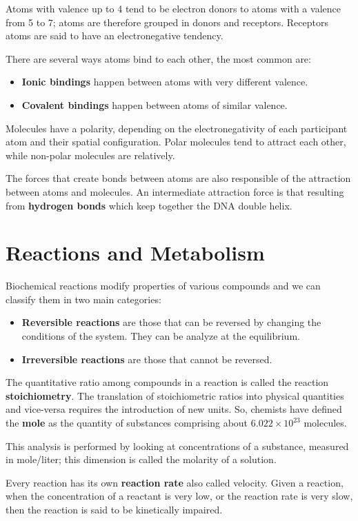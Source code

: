 Atoms with valence up to 4 tend to be electron donors to atoms with a valence
from 5 to 7; atoms are therefore grouped in donors and receptors. Receptors atoms
are said to have an electronegative tendency.

There are several ways atoms bind to each other, the most common are:
\begin{itemize}
    \item \textbf{Ionic bindings} happen between atoms with very different valence.
    \item \textbf{Covalent bindings} happen between atoms of similar valence.
\end{itemize}

Molecules have a polarity, depending on the electronegativity of each participant
atom and their spatial configuration. Polar molecules tend to attract each other,
while non-polar molecules are relatively.

The forces that create bonds between atoms are also responsible of the attraction
between atoms and molecules. An intermediate attraction force is that resulting
from \textbf{hydrogen bonds} which keep together the DNA double helix.
\section{Reactions and Metabolism}
Biochemical reactions modify properties of various compounds and we can classify
them in two main categories:
\begin{itemize}
    \item \textbf{Reversible reactions} are those that can be reversed by changing
          the conditions of the system. They can be analyze at the equilibrium.
    \item \textbf{Irreversible reactions} are those that cannot be reversed.
\end{itemize}
The quantitative ratio among compounds in a reaction is called the reaction
\textbf{stoichiometry}.
The translation of stoichiometric ratios into physical quantities and vice-versa
requires the introduction of new units. So, chemists have defined the \textbf{mole}
as the quantity of substances comprising about $6.022 \times 10^{23}$ molecules.

This analysis is performed by looking at concentrations of a substance, measured
in mole/liter; this dimension is called the molarity of a solution.

Every reaction has its own \textbf{reaction rate} also called velocity. Given a reaction,
when the concentration of a reactant is very low, or the reaction rate is very
slow, then the reaction is said to be kinetically impaired.

